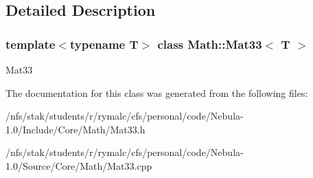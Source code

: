 \subsection{Detailed Description}
\subsubsection*{template$<$typename T$>$ class Math::Mat33$<$ T $>$}

Mat33 

The documentation for this class was generated from the following files:\begin{DoxyCompactItemize}
\item 
/nfs/stak/students/r/rymalc/cfs/personal/code/Nebula-\/1.0/Include/Core/Math/Mat33.h\item 
/nfs/stak/students/r/rymalc/cfs/personal/code/Nebula-\/1.0/Source/Core/Math/Mat33.cpp\end{DoxyCompactItemize}
